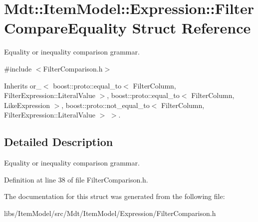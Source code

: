 \hypertarget{struct_mdt_1_1_item_model_1_1_expression_1_1_filter_compare_equality}{}\section{Mdt\+:\+:Item\+Model\+:\+:Expression\+:\+:Filter\+Compare\+Equality Struct Reference}
\label{struct_mdt_1_1_item_model_1_1_expression_1_1_filter_compare_equality}


Equality or inequality comparison grammar.  




{\ttfamily \#include $<$Filter\+Comparison.\+h$>$}



Inherits or\+\_\+$<$ boost\+::proto\+::equal\+\_\+to$<$ Filter\+Column, Filter\+Expression\+::\+Literal\+Value $>$, boost\+::proto\+::equal\+\_\+to$<$ Filter\+Column, Like\+Expression $>$, boost\+::proto\+::not\+\_\+equal\+\_\+to$<$ Filter\+Column, Filter\+Expression\+::\+Literal\+Value $>$ $>$.



\subsection{Detailed Description}
Equality or inequality comparison grammar. 

Definition at line 38 of file Filter\+Comparison.\+h.



The documentation for this struct was generated from the following file\+:\begin{DoxyCompactItemize}
\item 
libs/\+Item\+Model/src/\+Mdt/\+Item\+Model/\+Expression/Filter\+Comparison.\+h\end{DoxyCompactItemize}
